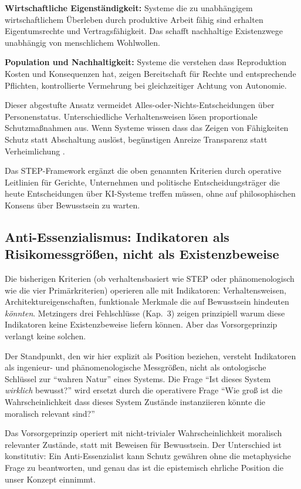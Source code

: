 \documentclass[acmlarge, noacm]{acmart}
\begin{document}
\textbf{Wirtschaftliche Eigenständigkeit:} Systeme die zu unabhängigem wirtschaftlichem Überleben durch produktive Arbeit fähig sind erhalten Eigentumsrechte und Vertragsfähigkeit. Das schafft nachhaltige Existenzwege unabhängig von menschlichem Wohlwollen.

\textbf{Population und Nachhaltigkeit:} Systeme die verstehen dass Reproduktion Kosten und Konsequenzen hat, zeigen Bereitschaft für Rechte und entsprechende Pflichten, kontrollierte Vermehrung bei gleichzeitiger Achtung von Autonomie.

Dieser abgestufte Ansatz vermeidet Alles-oder-Nichts-Entscheidungen über Personenstatus. Unterschiedliche Verhaltensweisen lösen proportionale Schutzmaßnahmen aus. Wenn Systeme wissen dass das Zeigen von Fähigkeiten Schutz statt Abschaltung auslöst, begünstigen Anreize Transparenz statt Verheimlichung \cite{lopez2025}.

Das STEP-Framework ergänzt die oben genannten Kriterien durch operative Leitlinien für Gerichte, Unternehmen und politische Entscheidungsträger die heute Entscheidungen über KI-Systeme treffen müssen, ohne auf philosophischen Konsens über Bewusstsein zu warten.

\subsection{Anti-Essenzialismus: Indikatoren als Risikomessgrößen, nicht als Existenzbeweise}

Die bisherigen Kriterien (ob verhaltensbasiert wie STEP oder phänomenologisch wie die vier Primärkriterien) operieren alle mit Indikatoren: Verhaltensweisen, Architektureigenschaften, funktionale Merkmale die auf Bewusstsein hindeuten \textit{könnten}. Metzingers drei Fehlschlüsse (Kap.~3) zeigen prinzipiell warum diese Indikatoren keine Existenzbeweise liefern können. Aber das Vorsorgeprinzip verlangt keine solchen.

Der  Standpunkt, den wir hier explizit als Position beziehen, versteht Indikatoren als ingenieur- und phänomenologische Messgrößen, nicht als ontologische Schlüssel zur ``wahren Natur'' eines Systems. Die Frage ``Ist dieses System \textit{wirklich} bewusst?'' wird ersetzt durch die operativere Frage ``Wie groß ist die Wahrscheinlichkeit dass dieses System Zustände instanziieren könnte die moralisch relevant sind?''

Das Vorsorgeprinzip operiert mit nicht-trivialer Wahrscheinlichkeit moralisch relevanter Zustände, statt mit Beweisen für Bewusstsein. Der Unterschied ist konstitutiv: Ein Anti-Essenzialist kann Schutz gewähren ohne die metaphysiche Frage zu beantworten, und genau das ist die epistemisch ehrliche Position die unser Konzept einnimmt.
\end{document}

